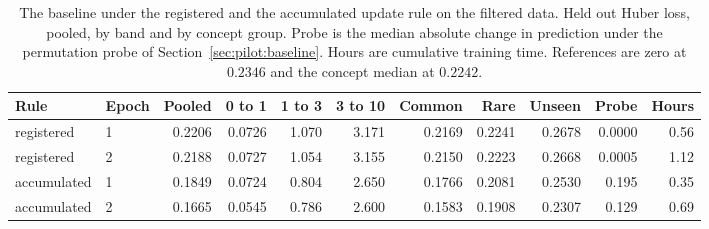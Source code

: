 \begin{table}[!htbp]
\caption{The baseline under the registered and the accumulated update rule on the filtered data. Held out Huber loss, pooled, by band and by concept group. Probe is the median absolute change in prediction under the permutation probe of Section~\ref{sec:pilot:baseline}. Hours are cumulative training time. References are zero at $0.2346$ and the concept median at $0.2242$.}
\label{tab:baseline}
\small
\setlength{\tabcolsep}{4pt}
\begin{tabular}{llrrrrrrrrr}
\toprule
Rule & Epoch & Pooled & 0 to 1 & 1 to 3 & 3 to 10 & Common & Rare & Unseen & Probe & Hours \\
\midrule
registered & 1 & 0.2206 & 0.0726 & 1.070 & 3.171 & 0.2169 & 0.2241 & 0.2678 & 0.0000 & 0.56 \\
registered & 2 & 0.2188 & 0.0727 & 1.054 & 3.155 & 0.2150 & 0.2223 & 0.2668 & 0.0005 & 1.12 \\
accumulated & 1 & 0.1849 & 0.0724 & 0.804 & 2.650 & 0.1766 & 0.2081 & 0.2530 & 0.195 & 0.35 \\
accumulated & 2 & 0.1665 & 0.0545 & 0.786 & 2.600 & 0.1583 & 0.1908 & 0.2307 & 0.129 & 0.69 \\
\bottomrule
\end{tabular}
\end{table}